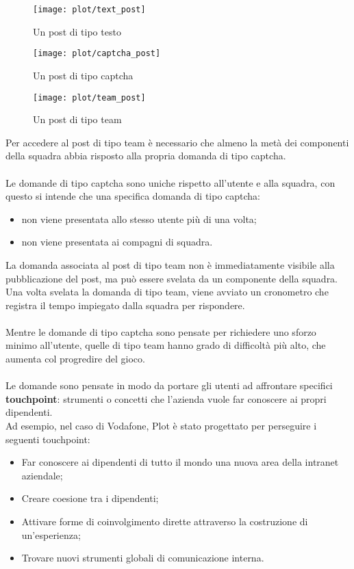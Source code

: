 \begin{figure}[htbp]
\begin{center}
\texttt{[image: plot/text\_post]}
\caption{Un post di tipo testo}
\end{center}
\end{figure}

\begin{figure}[htbp]
\begin{center}
\texttt{[image: plot/captcha\_post]}
\caption{Un post di tipo captcha}
\end{center}
\end{figure}

\begin{figure}[htbp]
\begin{center}
\texttt{[image: plot/team\_post]}
\caption{Un post di tipo team}
\end{center}
\end{figure}

Per accedere al post di tipo team è necessario che almeno la metà dei componenti della squadra abbia risposto alla propria domanda di tipo captcha. 
\\ \\
Le domande di tipo captcha sono uniche rispetto all'utente e alla squadra, con questo si intende che una specifica domanda di tipo captcha:
\begin{itemize}
	\item non viene presentata allo stesso utente più di una volta;
	\item non viene presentata ai compagni di squadra.
\end{itemize}

La domanda associata al post di tipo team non è immediatamente visibile alla pubblicazione del post, ma può essere svelata da un componente della squadra. Una volta svelata la domanda di tipo team, viene avviato un cronometro che registra il tempo impiegato dalla squadra per rispondere.
\\ \\
Mentre le domande di tipo captcha sono pensate per richiedere uno sforzo minimo all’utente, quelle di tipo team hanno grado di difficoltà più alto, che aumenta col progredire del gioco.
\\ \\
Le domande sono pensate in modo da portare gli utenti ad affrontare specifici \textbf{touchpoint}: strumenti o concetti che l'azienda vuole far conoscere ai propri dipendenti. \\
Ad esempio, nel caso di Vodafone, Plot è stato progettato per perseguire i seguenti touchpoint:
\begin{itemize}
	\item Far conoscere ai dipendenti di tutto il mondo una nuova area della intranet aziendale;
	\item Creare coesione tra i dipendenti;
	\item Attivare forme di coinvolgimento dirette attraverso la costruzione di un'esperienza;
	\item Trovare nuovi strumenti globali di comunicazione interna.
\end{itemize}

